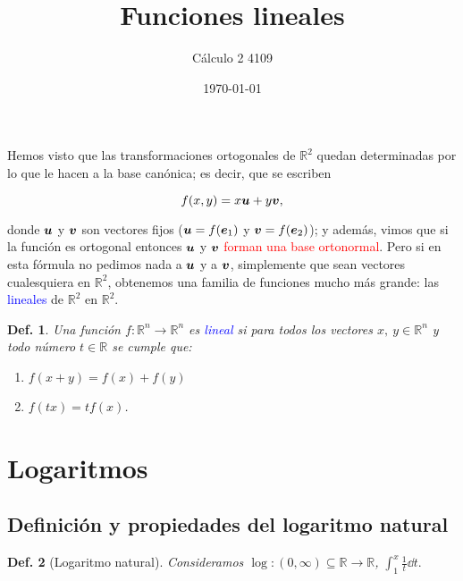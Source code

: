 \documentclass{article}
\title{\Huge{Funciones lineales}}
\author{Cálculo 2 4109}
\date{\today}
\theoremstyle{definicion}
\newtheorem{definicion}{Def.}
\theoremstyle{definition}             %
\theoremstyle{definition}             %
\theoremstyle{definition}
\theoremstyle{definition}
\theoremstyle{observacion}
\theoremstyle{definition}
\theoremstyle{plain}
\theoremstyle{definition}
\theoremstyle{afirmacion}
\theoremstyle{definition}
\begin{document}
    \maketitle

    Hemos visto que las transformaciones ortogonales de \(\mathbb{R}^{2}\) quedan determinadas por lo que le hacen a la base canónica; es decir, que se escriben

    \begin{equation*}
        f(x, y) = x\vb*{u} + y\vb*{v},
    \end{equation*}

    donde \(\vb*{u}\) y \(\vb*{v}\) son vectores fijos (\(\vb*{u} = f(\vb*{e}_{1})\) y \(\vb*{v} = f(\vb*{e}_{2})\)); y además, vimos que si la función es ortogonal entonces \(\vb*{u}\) y \(\vb*{v}\) \textcolor{red}{forman una base ortonormal}. Pero si en esta fórmula no pedimos nada a \(\vb*{u}\) y a \(\vb*{v}\), simplemente que sean vectores cualesquiera en \(\mathbb{R}^{2}\), obtenemos una familia de funciones mucho más grande: las \textcolor{blue}{lineales} de \(\mathbb{R}^{2}\) en \(\mathbb{R}^{2}\).

    \begin{definicion}
        Una función \(f \colon \mathbb{R}^{n} \to \mathbb{R}^{n}\) es \textcolor{blue}{lineal} si para todos los vectores \(x,\ y\in \mathbb{R}^{n}\) y todo número \(t\in\mathbb{R}\) se cumple que:

        \begin{enumerate}[label = \Roman*)]
            \item \(f(x + y) = f(x) + f(y)\)
            \item \(f(tx) = tf(x)\).
        \end{enumerate}
    \end{definicion}

    \section{Logaritmos}
    \subsection{Definición y propiedades del logaritmo natural}

    \begin{definicion}[Logaritmo natural]   
        Consideramos \(\log \colon (0, \infty) \subseteq \mathbb{R} \to \mathbb{R}\), \(\int_{1}^{x}\frac{1}{t}\dd{t}.\)
    \end{definicion}
\end{document}
